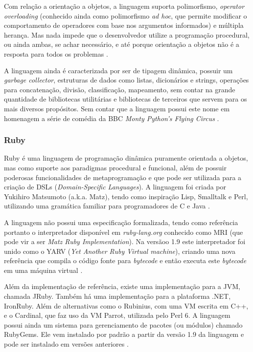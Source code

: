 \documentclass[diss]{template/setrem}
\begin{document}
Com relação a orientação a objetos, a linguagem suporta polimorfismo, \emph{operator overloading} (conhecido ainda como polimorfismo \emph{ad hoc}, que permite modificar o comportamento de operadores com base nos argumentos informados) e múltipla herança. Mas nada impede que o desenvolvedor utilize a programação procedural, ou ainda ambas, se achar necessário, e até porque orientação a objetos não é a resposta para todos os problemas \citep{Lutz2010}.

A linguagem ainda é caracterizada por ser de tipagem dinâmica, possuir um \emph{garbage collector}, estruturas de dados como listas, dicionários e strings, operações para concatenação, divisão, classificação, mapeamento, sem contar na grande quantidade de bibliotecas utilitárias e bibliotecas de terceiros que servem para os mais diversos propósitos. Sem contar que a linguagem possui este nome em homenagem a série de comédia da BBC \emph{Monty Python's Flying Circus} \citep{Lutz2010}.

\subsubsection{Ruby}
Ruby é uma linguagem de programação dinâmica puramente orientada a objetos, mas como suporte aos paradigmas procedural e funcional, além de possuir poderosas funcionalidades de metaprogramação e que pode ser utilizada para a criação de DSLs (\emph{Domain-Specific Languages}). A linguagem foi criada por Yukihiro Matsumoto (a.k.a. Matz), tendo como inspiração Lisp, Smalltalk e Perl, utilizando uma gramática familiar para programadores de C e Java \citep{Flanagan2008}.

A linguagem não possui uma especificação formalizada, tendo como referência portanto o interpretador disponível em \emph{ruby-lang.org} conhecido como MRI (que pode vir a ser \emph{Matz Ruby Implementation}). Na versãoo 1.9 este interpretador foi unido como o YARV (\emph{Yet Another Ruby Virtual machine}), criando uma nova referência que compila o código fonte para \emph{bytecode} e então executa este \emph{bytecode} em uma máquina virtual \citep{Flanagan2008}.

Além da implementação de referência, existe uma implementação para a JVM, chamada JRuby. Também há uma implementação para a plataforma .NET, IronRuby. Além de alternativas como o Rubinius, com uma VM escrita em C++, e o Cardinal, que faz uso da VM Parrot, utilizada pelo Perl 6. A linguagem possui ainda um sistema para gerenciamento de pacotes (ou módulos) chamado RubyGems. Ele vem instalado por padrão a partir da versão 1.9 da linguagem e pode ser instalado em versões anteriores \citep{Flanagan2008}.
\end{document}
